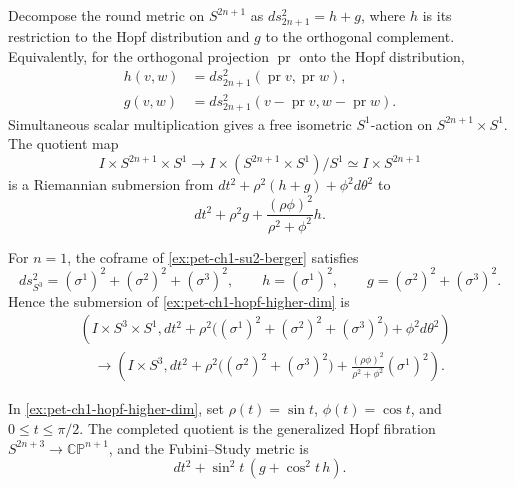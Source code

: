 \begin{example}
  \label{ex:pet-ch1-hopf-higher-dim}


  Decompose the round metric on $S^{2n+1}$ as $ds_{2n+1}^2=h+g$, where $h$
  is its restriction to the Hopf distribution and $g$ to the orthogonal
  complement. Equivalently, for the orthogonal projection $\operatorname{pr}$
  onto the Hopf distribution,
  \[
  \begin{aligned}
    h(v,w)&=ds_{2n+1}^2(\operatorname{pr}v,\operatorname{pr}w),\\
    g(v,w)&=ds_{2n+1}^2(v-\operatorname{pr}v,w-\operatorname{pr}w).
  \end{aligned}
  \]
  Simultaneous scalar multiplication gives a free isometric $S^1$-action on
  $S^{2n+1}\times S^1$. The quotient map
  \[
    I\times S^{2n+1}\times S^1
      \longrightarrow I\times (S^{2n+1}\times S^1)/S^1
      \simeq I\times S^{2n+1}
  \]
  is a Riemannian submersion from
  $dt^2+\rho^2(h+g)+\phi^2d\theta^2$ to
  \[
    dt^2+\rho^2g+\frac{(\rho\phi)^2}{\rho^2+\phi^2}h.
  \]
\end{example}

\begin{example}
  \label{ex:pet-ch1-hopf-su2-coframe}


  For $n=1$, the coframe of \cref{ex:pet-ch1-su2-berger} satisfies
  \[
    ds_{S^3}^2=(\sigma^1)^2+(\sigma^2)^2+(\sigma^3)^2,
    \qquad h=(\sigma^1)^2,
    \qquad g=(\sigma^2)^2+(\sigma^3)^2.
  \]
  Hence the submersion of \cref{ex:pet-ch1-hopf-higher-dim} is
  \[
  \begin{aligned}
   &\left(I\times S^3\times S^1,
     dt^2+\rho^2\big((\sigma^1)^2+(\sigma^2)^2+(\sigma^3)^2\big)
       +\phi^2d\theta^2\right)\\
   &\quad\longrightarrow
    \left(I\times S^3,
     dt^2+\rho^2\big((\sigma^2)^2+(\sigma^3)^2\big)
       +\frac{(\rho\phi)^2}{\rho^2+\phi^2}(\sigma^1)^2\right).
  \end{aligned}
  \]
\end{example}

\begin{example}
  \label{ex:pet-ch1-generalized-hopf}


  In \cref{ex:pet-ch1-hopf-higher-dim}, set
  $\rho(t)=\sin t$, $\phi(t)=\cos t$, and $0\le t\le\pi/2$. The completed
  quotient is the generalized Hopf fibration
  $S^{2n+3}\to\mathbb{CP}^{n+1}$, and the Fubini--Study metric is
  \[
    dt^2+\sin^2t\,(g+\cos^2t\,h).
  \]
\end{example}

